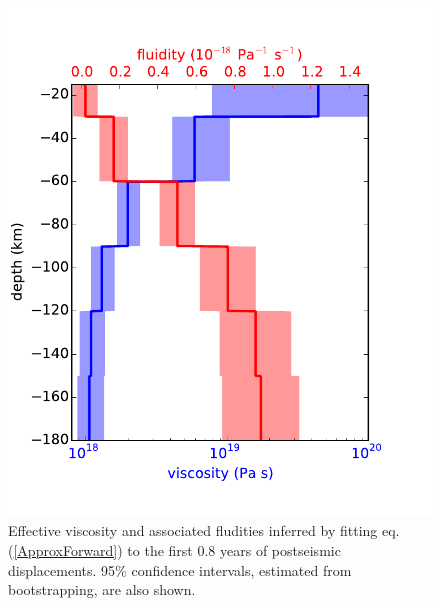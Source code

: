 \documentclass[review]{elsarticle}
\begin{document}
\begin{figure}
\includegraphics[scale=0.7]{Figures/EffectiveViscosity}
\centering 
\caption{Effective viscosity and associated fludities inferred by fitting eq. (\ref{ApproxForward}) to the first 0.8 years of postseismic displacements. 95\% confidence intervals, estimated from bootstrapping, are also shown.}
\label{fig:EffectiveViscosity}
\end{figure} 
\end{document}
